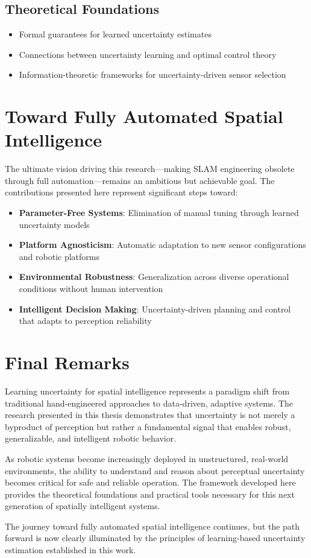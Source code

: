 \subsection{Theoretical Foundations}
\begin{itemize}
    \item Formal guarantees for learned uncertainty estimates
    \item Connections between uncertainty learning and optimal control theory
    \item Information-theoretic frameworks for uncertainty-driven sensor selection
\end{itemize}

\section{Toward Fully Automated Spatial Intelligence}

The ultimate vision driving this research—making SLAM engineering obsolete through full automation—remains an ambitious but achievable goal. The contributions presented here represent significant steps toward:

\begin{itemize}
    \item \textbf{Parameter-Free Systems}: Elimination of manual tuning through learned uncertainty models
    \item \textbf{Platform Agnosticism}: Automatic adaptation to new sensor configurations and robotic platforms
    \item \textbf{Environmental Robustness}: Generalization across diverse operational conditions without human intervention
    \item \textbf{Intelligent Decision Making}: Uncertainty-driven planning and control that adapts to perception reliability
\end{itemize}

\section{Final Remarks}

Learning uncertainty for spatial intelligence represents a paradigm shift from traditional hand-engineered approaches to data-driven, adaptive systems. The research presented in this thesis demonstrates that uncertainty is not merely a byproduct of perception but rather a fundamental signal that enables robust, generalizable, and intelligent robotic behavior.

As robotic systems become increasingly deployed in unstructured, real-world environments, the ability to understand and reason about perceptual uncertainty becomes critical for safe and reliable operation. The framework developed here provides the theoretical foundations and practical tools necessary for this next generation of spatially intelligent systems.

The journey toward fully automated spatial intelligence continues, but the path forward is now clearly illuminated by the principles of learning-based uncertainty estimation established in this work.